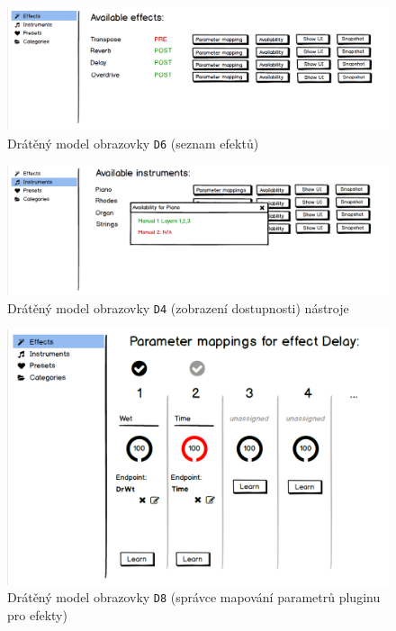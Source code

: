 \documentclass[thesis=M,czech]{FITthesis}[2019/03/06]
\begin{document}
	\begin{figure}
		\centering
		\includegraphics[width=1\textwidth]{DesktopUI-EffectList}
		\caption{Drátěný model obrazovky \texttt{D6} (seznam efektů)}\label{fig:DesktopUI-EffectList}
	\end{figure}
	\begin{figure}
		\centering
		\includegraphics[width=1\textwidth]{DesktopUI-InstrumentAvailability}
		\caption{Drátěný model obrazovky \texttt{D4} (zobrazení dostupnosti) nástroje}\label{fig:DesktopUI-InstrumentAvailability}
	\end{figure}
	\begin{figure}
		\centering
		\includegraphics[width=1\textwidth]{DesktopUI-EffectParamMapping}
		\caption{Drátěný model obrazovky \texttt{D8} (správce mapování parametrů pluginu pro efekty)}\label{fig:DesktopUI-EffectParamMapping}
	\end{figure}
\end{document}
